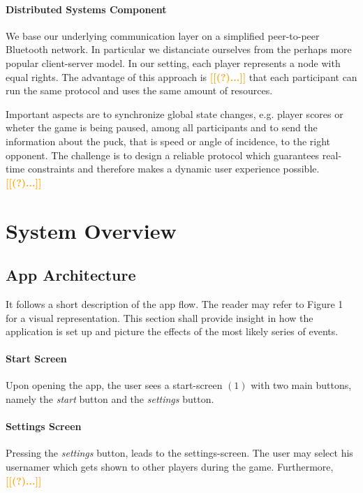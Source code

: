 \documentclass{report}
\newcommand{\todo}[1]{\textsf{\textbf{\textcolor{orange}{[[#1]]}}}}
\begin{document}
\paragraph{Distributed Systems Component} We base our underlying communication layer on a simplified peer-to-peer Bluetooth network. In particular we distanciate ourselves from the perhaps more popular client-server model. In our setting, each player represents a node with equal rights. The advantage of this approach is \todo{(?)...} that each participant can run the same protocol and uses the same amount of resources. 

Important aspects are to synchronize global state changes, e.g. player scores or wheter the game is being paused, among all participants and to send the information about the puck, that is speed or angle of incidence, to the right opponent. The challenge is to design a reliable protocol which guarantees real-time constraints and therefore makes a dynamic user experience possible. \todo{(?)...}

\section{System Overview}

\subsection{App Architecture} 
It follows a short description of the app flow. The reader may refer to Figure 1 for a visual representation. This section shall provide insight in how the application is set up and picture the effects of the most likely series of events.

\paragraph{Start Screen}
 Upon opening the app, the user sees a start-screen $(1)$ with two main buttons, namely the \textit{start} button and the \textit{settings} button. 

\paragraph{Settings Screen}
Pressing the \textit{settings} button, leads to the settings-screen. The user may select his usernamer which gets shown to other players during the game. Furthermore, \todo{(?)...}
\end{document}

